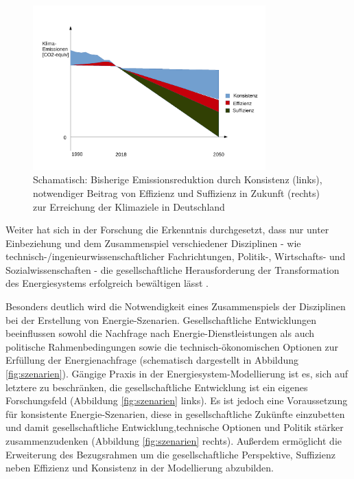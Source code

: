 \documentclass[a4paper,11pt,twoside]{scrartcl}
\begin{document}
\begin{figure}[!h]
    \centering
    \includegraphics[width=0.8\textwidth]{figures/Zusammenspiel2.pdf}
    \caption{Schamatisch: Bisherige Emissionsreduktion durch Konsistenz (links), notwendiger Beitrag von Effizienz und Suffizienz in Zukunft (rechts) zur Erreichung der Klimaziele in Deutschland}
    \label{fig:zusammenspiel}
\end{figure}

Weiter hat sich in der Forschung die Erkenntnis durchgesetzt, dass nur unter Einbeziehung und dem Zusammenspiel verschiedener Disziplinen - wie technisch-/ingenieurwissenschaftlicher Fachrichtungen, Politik-, Wirtschafts- und Sozialwissenschaften - die gesellschaftliche Herausforderung der Transformation des Energiesystems erfolgreich bewältigen lässt \cite{WGBU2012}.

Besonders deutlich wird die Notwendigkeit eines Zusammenspiels der Disziplinen bei der Erstellung von Energie-Szenarien. Gesellschaftliche Entwicklungen beeinflussen sowohl die Nachfrage nach Energie-Dienstleistungen als auch politische Rahmenbedingungen sowie die technisch-ökonomischen Optionen zur Erfüllung der Energienachfrage (schematisch dargestellt in Abbildung \ref{fig:szenarien}). Gängige Praxis in der Energiesystem-Modellierung ist es, sich auf letztere zu beschränken, die gesellschaftliche Entwicklung ist ein eigenes Forschungsfeld (Abbildung \ref{fig:szenarien} links). Es ist jedoch eine Voraussetzung für konsistente Energie-Szenarien, diese in gesellschaftliche Zukünfte einzubetten und damit gesellschaftliche Entwicklung,technische Optionen und Politik stärker zusammenzudenken (Abbildung \ref{fig:szenarien} rechts). Außerdem ermöglicht die Erweiterung des Bezugsrahmen um die gesellschaftliche Perspektive, Suffizienz neben Effizienz und Konsistenz in der Modellierung abzubilden. 
\end{document}

